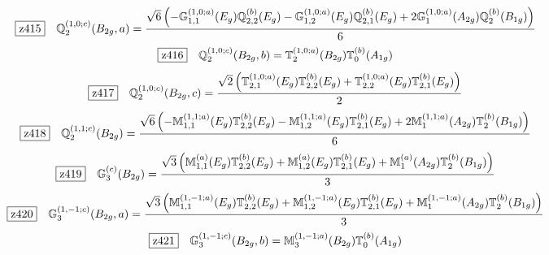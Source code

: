 \documentclass[fleqn,10pt,landscape]{jsarticle}
\begin{document}
\begin{dmath*}
\hspace*{3mm}\fbox{z415}\quad \mathbb{Q}_{2}^{(1,0;c)}(B_{2g},a)=\frac{\sqrt{6} \left(- \mathbb{G}_{1,1}^{(1,0;a)}(E_{g}) \mathbb{Q}_{2,2}^{(b)}(E_{g}) - \mathbb{G}_{1,2}^{(1,0;a)}(E_{g}) \mathbb{Q}_{2,1}^{(b)}(E_{g}) + 2 \mathbb{G}_{1}^{(1,0;a)}(A_{2g}) \mathbb{Q}_{2}^{(b)}(B_{1g})\right)}{6}
\end{dmath*}
\begin{dmath*}
\hspace*{3mm}\fbox{z416}\quad \mathbb{Q}_{2}^{(1,0;c)}(B_{2g},b)=\mathbb{T}_{2}^{(1,0;a)}(B_{2g}) \mathbb{T}_{0}^{(b)}(A_{1g})
\end{dmath*}
\begin{dmath*}
\hspace*{3mm}\fbox{z417}\quad \mathbb{Q}_{2}^{(1,0;c)}(B_{2g},c)=\frac{\sqrt{2} \left(\mathbb{T}_{2,1}^{(1,0;a)}(E_{g}) \mathbb{T}_{2,2}^{(b)}(E_{g}) + \mathbb{T}_{2,2}^{(1,0;a)}(E_{g}) \mathbb{T}_{2,1}^{(b)}(E_{g})\right)}{2}
\end{dmath*}
\begin{dmath*}
\hspace*{3mm}\fbox{z418}\quad \mathbb{Q}_{2}^{(1,1;c)}(B_{2g})=\frac{\sqrt{6} \left(- \mathbb{M}_{1,1}^{(1,1;a)}(E_{g}) \mathbb{T}_{2,2}^{(b)}(E_{g}) - \mathbb{M}_{1,2}^{(1,1;a)}(E_{g}) \mathbb{T}_{2,1}^{(b)}(E_{g}) + 2 \mathbb{M}_{1}^{(1,1;a)}(A_{2g}) \mathbb{T}_{2}^{(b)}(B_{1g})\right)}{6}
\end{dmath*}
\begin{dmath*}
\hspace*{3mm}\fbox{z419}\quad \mathbb{G}_{3}^{(c)}(B_{2g})=\frac{\sqrt{3} \left(\mathbb{M}_{1,1}^{(a)}(E_{g}) \mathbb{T}_{2,2}^{(b)}(E_{g}) + \mathbb{M}_{1,2}^{(a)}(E_{g}) \mathbb{T}_{2,1}^{(b)}(E_{g}) + \mathbb{M}_{1}^{(a)}(A_{2g}) \mathbb{T}_{2}^{(b)}(B_{1g})\right)}{3}
\end{dmath*}
\begin{dmath*}
\hspace*{3mm}\fbox{z420}\quad \mathbb{G}_{3}^{(1,-1;c)}(B_{2g},a)=\frac{\sqrt{3} \left(\mathbb{M}_{1,1}^{(1,-1;a)}(E_{g}) \mathbb{T}_{2,2}^{(b)}(E_{g}) + \mathbb{M}_{1,2}^{(1,-1;a)}(E_{g}) \mathbb{T}_{2,1}^{(b)}(E_{g}) + \mathbb{M}_{1}^{(1,-1;a)}(A_{2g}) \mathbb{T}_{2}^{(b)}(B_{1g})\right)}{3}
\end{dmath*}
\begin{dmath*}
\hspace*{3mm}\fbox{z421}\quad \mathbb{G}_{3}^{(1,-1;c)}(B_{2g},b)=\mathbb{M}_{3}^{(1,-1;a)}(B_{2g}) \mathbb{T}_{0}^{(b)}(A_{1g})
\end{dmath*}
\end{document}
